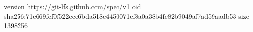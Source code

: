 version https://git-lfs.github.com/spec/v1
oid sha256:71e669fef0f522ece6bda518c4450071ef8a0a38b4fe82b9049af7ad59aadb53
size 1398256
